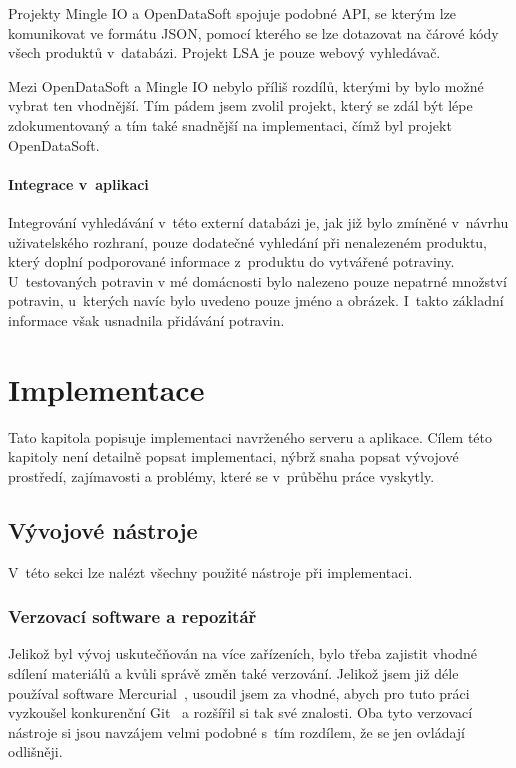 \documentclass[thesis=B,czech]{FITthesis}[2013/10/20]
\begin{document}
Projekty Mingle IO a OpenDataSoft spojuje podobné API, se kterým lze komunikovat ve formátu JSON, pomocí kterého se lze dotazovat na čárové kódy všech produktů v~databázi. Projekt LSA je pouze webový vyhledávač.

Mezi OpenDataSoft a Mingle IO nebylo příliš rozdílů, kterými by bylo možné vybrat ten vhodnější. Tím pádem jsem zvolil projekt, který se zdál být lépe zdokumentovaný a tím také snadnější na implementaci, čímž byl projekt OpenDataSoft.

\subsubsection{Integrace v~aplikaci}

Integrování vyhledávání v~této externí databázi je, jak již bylo zmíněné v~návrhu uživatelského rozhraní, pouze dodatečné vyhledání při nenalezeném produktu, který doplní podporované informace z~produktu do vytvářené potraviny. U~testovaných potravin v mé domácnosti bylo nalezeno pouze nepatrné množství potravin, u~kterých navíc bylo uvedeno pouze jméno a obrázek. I~takto základní informace však usnadnila přidávání potravin.

\chapter{Implementace}

Tato kapitola popisuje implementaci navrženého serveru a aplikace. Cílem této kapitoly není detailně popsat implementaci, nýbrž snaha popsat vývojové prostředí, zajímavosti a problémy, které se v~průběhu práce vyskytly.

\section{Vývojové nástroje}
V~této sekci lze nalézt všechny použité nástroje při implementaci.

\subsection{Verzovací software a repozitář}

Jelikož byl vývoj uskutečňován na více zařízeních, bylo třeba zajistit vhodné sdílení materiálů a kvůli správě změn také verzování. Jelikož jsem již déle používal software Mercurial~\cite{hg}, usoudil jsem za vhodné, abych pro tuto práci vyzkoušel konkurenční Git~\cite{git} a rozšířil si tak své znalosti. Oba tyto verzovací nástroje si jsou navzájem velmi podobné s~tím rozdílem, že se jen ovládají odlišněji.
\end{document}
